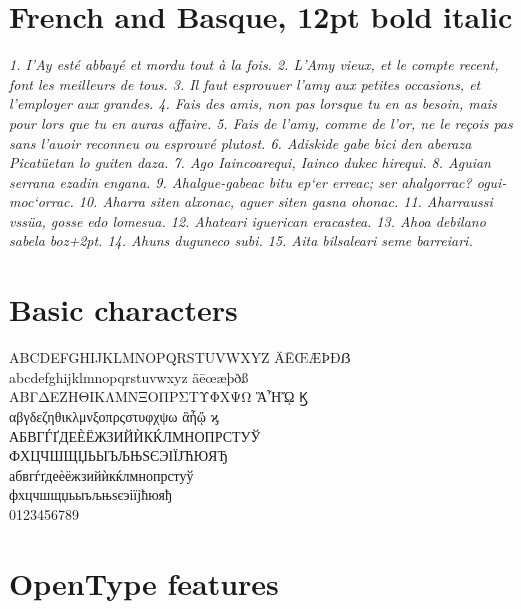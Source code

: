 \documentclass[12pt]{book}
\begin{document}
\section*{French and Basque, 12pt bold italic}

\textit{1. I'Ay esté abbayé et mordu tout à la fois.
2. L'Amy vieux, et le compte recent, font les meilleurs de tous.
3. Il faut esprouuer l'amy aux petites occasions, et l'employer aux grandes.
4. Fais des amis, non pas lorsque tu en as besoin, mais pour lors que tu en auras affaire.
5. Fais de l'amy, comme de l'or, ne le reçois pas sans l'auoir reconneu ou esprouvé plutost.
6. Adiskide gabe bici den aberaza Picatüetan
lo guiten daza. 7. Ago Iaincoarequi, Iainco dukec hirequi.
8. Aguian serrana ezadin engana.  9. Ahalgue-gabeac bitu ep‘er erreac;
ser ahalgorrac? ogui-moc‘orrac.  10. Aharra siten alxonac, aguer siten gasna
ohonac. 11. Aharraussi vssüa, gosse edo lomesua.
12. Ahateari iguerican eracastea. 13. Ahoa debilano sabela boz\kern+2pt.
14. Ahuns duguneco subi. 15. Aita bilsaleari seme barreiari.}

\section*{Basic characters}

\begin{center}\Large
ABCDEFGHIJKLMNOPQRSTUVWXYZ ÄĒŒÆÞÐẞ\\
abcdefghijklmnopqrstuvwxyz äēœæþðß\\
ΑΒΓΔΕΖΗΘΙΚΛΜΝΞΟΠΡΣΤΥΦΧΨΩ ἋἮᾬ Ϗ\\
αβγδεζηθικλμνξοπρςστυφχψω ἃἦᾤ ϗ\\
АБВГЃҐДЕЀЁЖЗИЙЍКЌЛМНОПРСТУЎ\\
ФХЦЧШЩЏЬЫЪЉЊЅЄЭІЇЈЋЮЯЂ\\
абвгѓґдеѐёжзийѝкќлмнопрстуў\\
фхцчшщџьыъљњѕєэіїјћюяђ\\
0123456789
\end{center}
\pagebreak



\section*{OpenType features}
\end{document}
